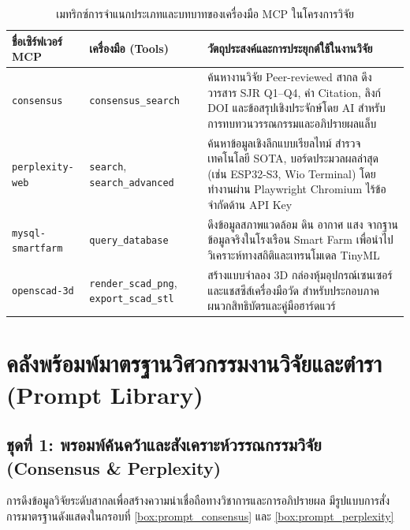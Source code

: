 \begin{table}[htbp]
\centering
\small
\begin{tabularx}{\textwidth}{l p{2.8cm} Y}
\toprule
\textbf{ชื่อเซิร์ฟเวอร์ MCP} & \textbf{เครื่องมือ (Tools)} & \textbf{วัตถุประสงค์และการประยุกต์ใช้ในงานวิจัย} \\
\midrule
\texttt{consensus} & \texttt{consensus\_search} & ค้นหางานวิจัย Peer-reviewed สากล ดึงวารสาร SJR Q1--Q4, ค่า Citation, ลิงก์ DOI และข้อสรุปเชิงประจักษ์โดย AI สำหรับการทบทวนวรรณกรรมและอภิปรายผลแล็บ \\
\addlinespace
\texttt{perplexity-web} & \texttt{search}, \texttt{search\_advanced} & ค้นหาข้อมูลเชิงลึกแบบเรียลไทม์ สำรวจเทคโนโลยี SOTA, บอร์ดประมวลผลล่าสุด (เช่น ESP32-S3, Wio Terminal) โดยทำงานผ่าน Playwright Chromium ไร้ข้อจำกัดด้าน API Key \\
\addlinespace
\texttt{mysql-smartfarm} & \texttt{query\_database} & ดึงข้อมูลสภาพแวดล้อม ดิน อากาศ แสง จากฐานข้อมูลจริงในโรงเรือน Smart Farm เพื่อนำไปวิเคราะห์ทางสถิติและเทรนโมเดล TinyML \\
\addlinespace
\texttt{openscad-3d} & \texttt{render\_scad\_png}, \texttt{export\_scad\_stl} & สร้างแบบจำลอง 3D กล่องหุ้มอุปกรณ์เซนเซอร์และแชสซีส์เครื่องมือวัด สำหรับประกอบภาคผนวกสิทธิบัตรและคู่มือฮาร์ดแวร์ \\
\bottomrule
\end{tabularx}
\caption{เมทริกซ์การจำแนกประเภทและบทบาทของเครื่องมือ MCP ในโครงการวิจัย}
\label{tab:mcp_tools_matrix}
\end{table}

\section{คลังพร้อมพ์มาตรฐานวิศวกรรมงานวิจัยและตำรา (Prompt Library)}

\subsection{ชุดที่ 1: พรอมพ์ค้นคว้าและสังเคราะห์วรรณกรรมวิจัย (Consensus \& Perplexity)}

การดึงข้อมูลวิจัยระดับสากลเพื่อสร้างความน่าเชื่อถือทางวิชาการและการอภิปรายผล มีรูปแบบการสั่งการมาตรฐานดังแสดงในกรอบที่ \ref{box:prompt_consensus} และ \ref{box:prompt_perplexity}

